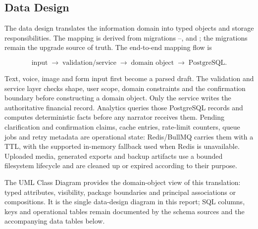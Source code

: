 \subsection{Data Design}

The data design translates the information domain into typed objects and storage responsibilities. The mapping is derived from migrations --,  and ; the migrations remain the upgrade source of truth. The end-to-end mapping flow is

\[
  \text{input} \;\rightarrow\; \text{validation/service}
  \;\rightarrow\; \text{domain object}
  \;\rightarrow\; \text{PostgreSQL}.
\]

Text, voice, image and form input first become a parsed draft. The validation and service layer checks shape, user scope, domain constraints and the confirmation boundary before constructing a domain object. Only the service writes the authoritative financial record. Analytics queries those PostgreSQL records and computes deterministic facts before any narrator receives them. Pending clarification and confirmation claims, cache entries, rate-limit counters, queue jobs and retry metadata are operational state: Redis/BullMQ carries them with a TTL, with the supported in-memory fallback used when Redis is unavailable. Uploaded media, generated exports and backup artifacts use a bounded filesystem lifecycle and are cleaned up or expired according to their purpose.

The UML Class Diagram provides the domain-object view of this translation: typed attributes, visibility, package boundaries and principal associations or compositions. It is the single data-design diagram in this report; SQL columns, keys and operational tables remain documented by the schema sources and the accompanying data tables below.


